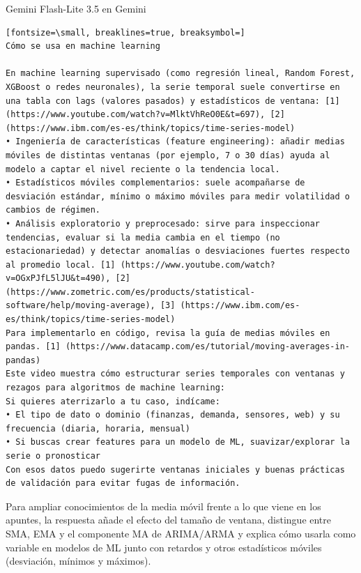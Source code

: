 \documentclass[12pt,a4paper,oneside]{book}
\begin{document}
\begin{iaresp}{Gemini Flash-Lite 3.5 en Gemini}
\begin{Verbatim}[fontsize=\small, breaklines=true, breaksymbol=]
Cómo se usa en machine learning

En machine learning supervisado (como regresión lineal, Random Forest, XGBoost o redes neuronales), la serie temporal suele convertirse en una tabla con lags (valores pasados) y estadísticos de ventana: [1] (https://www.youtube.com/watch?v=MlktVhReO0E&t=697), [2] (https://www.ibm.com/es-es/think/topics/time-series-model)
• Ingeniería de características (feature engineering): añadir medias móviles de distintas ventanas (por ejemplo, 7 o 30 días) ayuda al modelo a captar el nivel reciente o la tendencia local.
• Estadísticos móviles complementarios: suele acompañarse de desviación estándar, mínimo o máximo móviles para medir volatilidad o cambios de régimen.
• Análisis exploratorio y preprocesado: sirve para inspeccionar tendencias, evaluar si la media cambia en el tiempo (no estacionariedad) y detectar anomalías o desviaciones fuertes respecto al promedio local. [1] (https://www.youtube.com/watch?v=OGxPJfL5lJU&t=490), [2] (https://www.zometric.com/es/products/statistical-software/help/moving-average), [3] (https://www.ibm.com/es-es/think/topics/time-series-model)
Para implementarlo en código, revisa la guía de medias móviles en pandas. [1] (https://www.datacamp.com/es/tutorial/moving-averages-in-pandas)
Este video muestra cómo estructurar series temporales con ventanas y rezagos para algoritmos de machine learning:
Si quieres aterrizarlo a tu caso, indícame:
• El tipo de dato o dominio (finanzas, demanda, sensores, web) y su frecuencia (diaria, horaria, mensual)
• Si buscas crear features para un modelo de ML, suavizar/explorar la serie o pronosticar
Con esos datos puedo sugerirte ventanas iniciales y buenas prácticas de validación para evitar fugas de información.
\end{Verbatim}
\end{iaresp}
\begin{iaanalisis}
Para ampliar conocimientos de la media móvil frente a lo que viene en los apuntes, la respuesta añade el efecto del tamaño de ventana, distingue entre SMA, EMA y el componente MA de ARIMA/ARMA y explica cómo usarla como variable en modelos de ML junto con retardos y otros estadísticos móviles (desviación, mínimos y máximos).
\end{iaanalisis}
\end{document}

